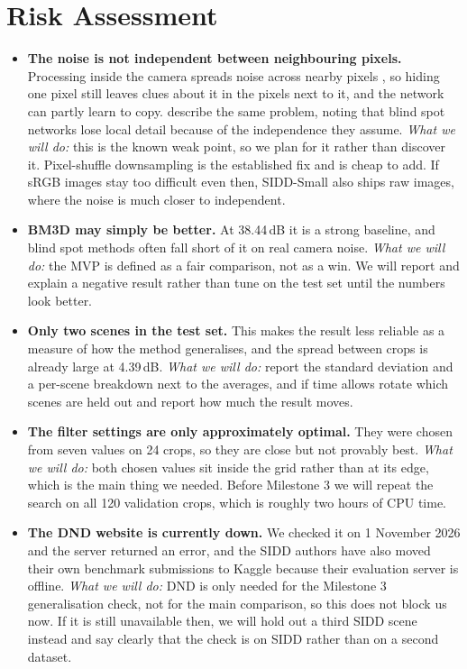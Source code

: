 \documentclass[11pt]{article}
\begin{document}
\section{Risk Assessment}
\label{sec:risk}
\begin{itemize}[leftmargin=*]
  \item \textbf{The noise is not independent between neighbouring pixels.} Processing inside
  the camera spreads noise across nearby pixels \citep{zhou2020awgn}, so hiding one pixel
  still leaves clues about it in the pixels next to it, and the network can partly learn to
  copy. \citet{cheng2025blindspot} describe the same problem, noting that blind spot
  networks lose local detail because of the independence they assume.
  \emph{What we will do:} this is the known weak point, so we plan for it rather than
  discover it. Pixel-shuffle downsampling is the established fix and is cheap to add. If
  sRGB images stay too difficult even then, SIDD-Small also ships raw images, where the
  noise is much closer to independent.
  \item \textbf{BM3D may simply be better.} At 38.44\,dB it is a strong baseline, and blind
  spot methods often fall short of it on real camera noise.
  \emph{What we will do:} the MVP is defined as a fair comparison, not as a win. We will
  report and explain a negative result rather than tune on the test set until the numbers
  look better.
  \item \textbf{Only two scenes in the test set.} This makes the result less reliable as a
  measure of how the method generalises, and the spread between crops is already large at
  4.39\,dB.
  \emph{What we will do:} report the standard deviation and a per-scene breakdown next to
  the averages, and if time allows rotate which scenes are held out and report how much the
  result moves.
  \item \textbf{The filter settings are only approximately optimal.} They were chosen from
  seven values on 24 crops, so they are close but not provably best.
  \emph{What we will do:} both chosen values sit inside the grid rather than at its edge,
  which is the main thing we needed. Before Milestone 3 we will repeat the search on all
  120 validation crops, which is roughly two hours of CPU time.
  \item \textbf{The DND website is currently down.} We checked it on 1 November 2026 and the
  server returned an error, and the SIDD authors have also moved their own benchmark
  submissions to Kaggle because their evaluation server is offline.
  \emph{What we will do:} DND is only needed for the Milestone 3 generalisation check, not
  for the main comparison, so this does not block us now. If it is still unavailable then,
  we will hold out a third SIDD scene instead and say clearly that the check is on SIDD
  rather than on a second dataset.
\end{itemize}
\end{document}
